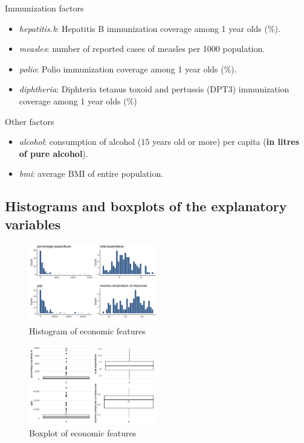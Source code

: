 Immunization factors
\begin{itemize}
	\item \textit{hepatitis.b}: Hepatitis B immunization coverage among 1 year olds (\%).
	\item \textit{measles}: number of reported cases of measles per 1000 population.
	\item \textit{polio}: Polio immunization coverage among 1 year olds (\%).
	\item \textit{diphtheria}: Diphteria tetanus toxoid and pertussis (DPT3) immunization coverage among 1 year olds (\%)
\end{itemize}

Other factors
\begin{itemize}
	\item \textit{alcohol}: consumption of alcohol ($15$ years old or more) per capita (\textbf{in litres of pure alcohol}).
	\item \textit{bmi}: average BMI of entire population.
\end{itemize}

\subsection*{Histograms and boxplots of the explanatory variables}


\begin{figure}[H]
	\centering
	\includegraphics[width=0.5\textwidth]{figures/eda/histogram_economic_features.png}
	\caption{Histogram of economic features}
	\label{fig:histogram_economic_features}
\end{figure}

\begin{figure}[H]
	\centering
	\includegraphics[width=0.5\textwidth]{figures/eda/boxplot_economic_features.png}
	\caption{Boxplot of economic features}
	\label{fig:boxplot_economic_features}
\end{figure}

